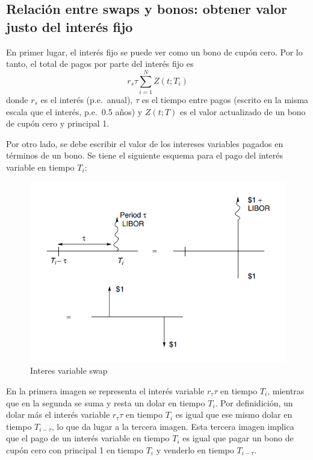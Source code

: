 \subsection{Relación entre swaps y bonos: obtener valor justo del interés fijo}
En primer lugar, el interés fijo se puede ver como un bono de cupón cero. Por lo tanto, el total de pagos por parte del interés fijo es
\[
    r_s\tau \sum_{i=1}^N Z(t;T_i)
\]
donde $r_s$ es el interés (p.e.\ anual), $\tau$ es el tiempo entre pagos (escrito en la misma escala que el interés, p.e.\ 0.5 años) y $Z(t;T)$ es el valor actualizado de un bono de cupón cero y principal 1.

Por otro lado, se debe escribir el valor de los intereses variables pagados en términos de un bono. Se tiene el siguiente esquema para el pago del interés variable en tiempo $T_i$:
 \begin{figure}[H]
    \centering
    \includegraphics[width=0.65\linewidth]{Imagenes/12_swaps/Relacion_Swaps_Bonos.png}
    \caption{Interes variable swap}
\end{figure}
En la primera imagen se representa el interés variable $r_\tau \tau$ en tiempo $T_i$, mientras que en la segunda se suma y resta un dolar en tiempo $T_i$. Por definidición, un dolar más el interés variable $r_\tau \tau$ en tiempo $T_i$ es igual que ese mismo dolar en tiempo $T_{i-\tau}$, lo que da lugar a la tercera imagen. Esta tercera imagen implica que el pago de un interés variable en tiempo $T_i$ es igual que pagar un bono de cupón cero con principal 1 en tiempo $T_i$ y venderlo en tiempo $T_{i-\tau}$.

